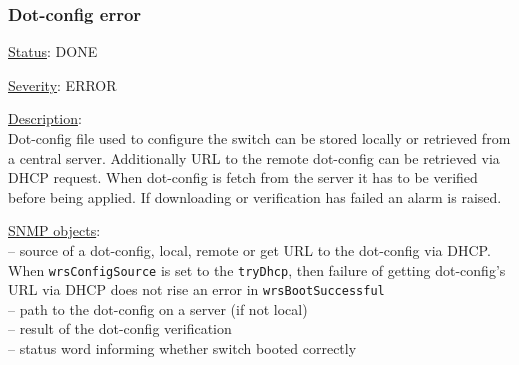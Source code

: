 \subsubsection{\bf Dot-config error}
		\label{fail:other:dot-config}
		\begin{pck_descr}
			\item [] \underline{Status}: DONE
			\item [] \underline{Severity}: ERROR
			\item [] \underline{Description}:\\
				Dot-config file used to configure the switch can be stored locally or
				retrieved from a central server. Additionally URL to the remote dot-config
				can be retrieved via DHCP request. When dot-config is fetch from the server
				it has to be verified before being applied. If downloading or verification has
				failed an alarm is raised.
			\item [] \underline{SNMP objects}:\\
				 -- source of a dot-config,
					local, remote or get URL to the dot-config via DHCP. When
					\texttt{wrsConfigSource} is set to the \texttt{tryDhcp}, then failure of
					getting dot-config's URL via DHCP does not rise an error in
					\texttt{wrsBootSuccessful}\\
				 -- path to the dot-config
					on a server (if not local)\\
				 -- result of the dot-config verification\\
				 -- status word informing
					whether switch booted correctly\\
				\\
		\end{pck_descr}

